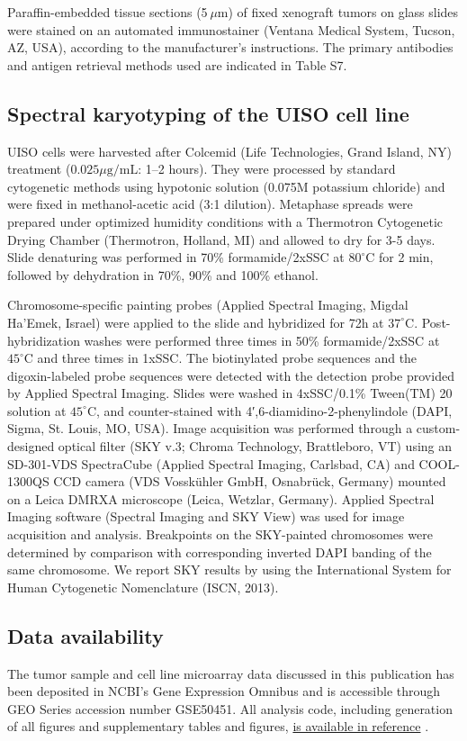 \documentclass[10pt]{article}
\begin{document}
Paraffin-embedded tissue sections (5 $\mu\mathrm{m}$) of fixed xenograft tumors on glass slides were stained on an automated immunostainer (Ventana Medical System, Tucson, AZ, USA), according to the manufacturer's instructions.
The primary antibodies and antigen retrieval methods used are indicated in Table S7.

\subsection*{Spectral karyotyping of the UISO cell line}

UISO cells were harvested after Colcemid (Life Technologies, Grand Island, NY) treatment ($0.025 \mu\textrm{g/mL}$: 1–2 hours).
They were processed by standard cytogenetic methods using hypotonic solution (0.075M potassium chloride) and were fixed in methanol-acetic acid (3:1 dilution).
Metaphase spreads were prepared under optimized humidity conditions with a Thermotron Cytogenetic Drying Chamber (Thermotron, Holland, MI) and allowed to dry for 3-5 days.
Slide denaturing was performed in 70\% formamide/2xSSC at $80^{\circ}\mathrm{C}$ for 2 min, followed by dehydration in 70\%, 90\% and 100\% ethanol.

Chromosome-specific painting probes (Applied Spectral Imaging, Migdal Ha’Emek, Israel) were applied to the slide and hybridized for 72h at $37^{\circ}\mathrm{C}$.
Post-hybridization washes were performed three times in 50\% formamide/2xSSC at $45^{\circ}\mathrm{C}$ and three times in 1xSSC.
The biotinylated probe sequences and the digoxin-labeled probe sequences were detected with the detection probe provided by Applied Spectral Imaging.
Slides were washed in 4xSSC/0.1\% Tween(TM) 20 solution at $45^{\circ}\mathrm{C}$, and counter-stained with 4′,6-diamidino-2-phenylindole (DAPI, Sigma, St. Louis, MO, USA).
Image acquisition was performed through a custom-designed optical filter (SKY v.3; Chroma Technology, Brattleboro, VT) using an SD-301-VDS SpectraCube (Applied Spectral Imaging, Carlsbad, CA) and COOL-1300QS CCD camera (VDS Vosskühler GmbH, Osnabrück, Germany) mounted on a Leica DMRXA microscope (Leica, Wetzlar, Germany).
Applied Spectral Imaging software (Spectral Imaging and SKY View) was used for image acquisition and analysis.
Breakpoints on the SKY-painted chromosomes were determined by comparison with corresponding inverted DAPI banding of the same chromosome.
We report SKY results by using the International System for Human Cytogenetic Nomenclature (ISCN, 2013).

\subsection*{Data availability}
The tumor sample and cell line microarray data discussed in this publication has been deposited in NCBI's Gene Expression Omnibus \citep{Edgar2002Gene} and is accessible through GEO Series accession number GSE50451.
All analysis code, including generation of all figures and supplementary tables and figures, \uline{is available in reference} \cite{DailyUISOReproducible2014}. %



\end{document}
